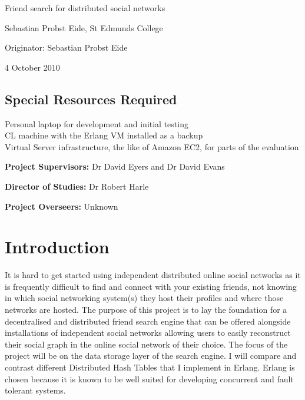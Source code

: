 

\vfil

\centerline{\Large Friend search for distributed social networks }
\vspace{0.4in}
\centerline{\large Sebastian Probst Eide, St Edmunds College }
\vspace{0.3in}
\centerline{\large Originator: Sebastian Probst Eide}
\vspace{0.3in}
\centerline{\large 4 October 2010}

\vfil

\subsection*{Special Resources Required}
Personal laptop for development and initial testing \\
CL machine with the Erlang VM installed as a backup \\
Virtual Server infrastructure, the like of Amazon EC2, for parts of the evaluation \\
\vspace{0.2in}

\noindent
{\bf Project Supervisors:} Dr David Eyers and Dr David Evans
\vspace{0.2in}

\noindent
{\bf Director of Studies:} Dr Robert Harle
\vspace{0.2in}
\noindent
 
\noindent
{\bf Project Overseers:} Unknown 

\vfil
\pagebreak


\section*{Introduction}

It is hard to get started using independent distributed online social networks as it is frequently difficult to find and connect with your existing friends, not knowing in which social networking system(s) they host their profiles and where those networks are hosted. The purpose of this project is to lay the foundation for a decentralised and distributed friend search engine that can be offered alongside installations of independent social networks allowing users to easily reconstruct their social graph in the online social network of their choice. The focus of the project will be on the data storage layer of the search engine. I will compare and contrast different Distributed Hash Tables that I implement in Erlang. Erlang is chosen because it is known to be well suited for developing concurrent and fault tolerant systems.

